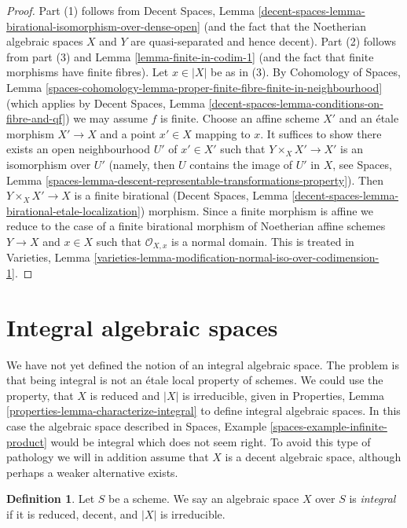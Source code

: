 \documentclass{stacks-project}
\theoremstyle{plain}
\theoremstyle{definition}
\newtheorem{definition}[subsection]{Definition}
\theoremstyle{remark}
\numberwithin{equation}{subsection}
\begin{document}
\begin{proof}
Part (1) follows from Decent Spaces, Lemma
\ref{decent-spaces-lemma-birational-isomorphism-over-dense-open}
(and the fact that the Noetherian algebraic spaces $X$ and $Y$
are quasi-separated and hence decent).
Part (2) follows from part (3) and Lemma \ref{lemma-finite-in-codim-1}
(and the fact that finite morphisms have finite fibres).
Let $x \in |X|$ be as in (3). By
Cohomology of Spaces, Lemma
\ref{spaces-cohomology-lemma-proper-finite-fibre-finite-in-neighbourhood}
(which applies by Decent Spaces, Lemma
\ref{decent-spaces-lemma-conditions-on-fibre-and-qf})
we may assume $f$ is finite. Choose an affine scheme $X'$ and
an \'etale morphism $X' \to X$ and a point $x' \in X$ mapping to $x$.
It suffices to show there exists an open neighbourhood $U'$ of $x' \in X'$
such that $Y \times_X X' \to X'$ is an isomorphism over $U'$
(namely, then $U$ contains the image of $U'$ in $X$, see Spaces, Lemma
\ref{spaces-lemma-descent-representable-transformations-property}).
Then $Y \times_X X' \to X$ is a finite birational
(Decent Spaces, Lemma \ref{decent-spaces-lemma-birational-etale-localization})
morphism. Since a finite morphism is affine we reduce to
the case of a finite birational morphism of Noetherian affine schemes
$Y \to X$ and $x \in X$ such that $\mathcal{O}_{X, x}$ is a
normal domain. This is treated in Varieties, Lemma
\ref{varieties-lemma-modification-normal-iso-over-codimension-1}.
\end{proof}






\section{Integral algebraic spaces}
\label{section-integral-spaces}

\noindent
We have not yet defined the notion of an integral algebraic space. The
problem is that being integral is not an \'etale local property of schemes.
We could use the property, that $X$ is reduced and $|X|$ is irreducible,
given in Properties, Lemma \ref{properties-lemma-characterize-integral}
to define integral algebraic spaces. In this case the algebraic
space described in Spaces, Example \ref{spaces-example-infinite-product}
would be integral which does not seem right.
To avoid this type of pathology we will in addition assume that $X$ is a
decent algebraic space, although perhaps a weaker alternative exists.

\begin{definition}
\label{definition-integral-algebraic-space}
Let $S$ be a scheme. We say an algebraic space $X$ over $S$ is
{\it integral} if it is reduced, decent, and $|X|$ is irreducible.
\end{definition}
\end{document}
